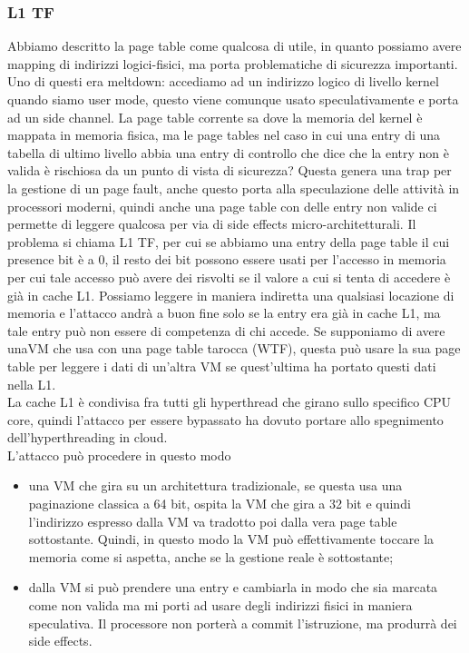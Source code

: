 \documentclass[12pt, oneside]{extbook}
\begin{document}
\subsubsection{L1 TF}
Abbiamo descritto la page table come qualcosa di utile, in quanto possiamo avere mapping di indirizzi logici-fisici, ma porta problematiche di sicurezza importanti. Uno di questi era meltdown: accediamo ad un indirizzo logico di livello kernel quando siamo user mode, questo viene comunque usato speculativamente e porta ad un side channel. La page table corrente sa dove la memoria del kernel è mappata in memoria fisica, ma le page tables nel caso in cui una entry di una tabella di ultimo livello abbia una entry di controllo che dice che la entry non è valida è rischiosa da un punto di vista di sicurezza? Questa genera una trap per la gestione di un page fault, anche questo porta alla speculazione delle attività in processori moderni, quindi anche una page table con delle entry non valide ci permette di leggere qualcosa per via di side effects micro-architetturali. Il problema si chiama L1 TF, per cui se abbiamo una entry della page table il cui presence bit è a 0, il resto dei bit possono essere usati per l'accesso in memoria per cui tale accesso può avere dei risvolti se il valore a cui si tenta di accedere è già in cache L1. Possiamo leggere in maniera indiretta una qualsiasi locazione di memoria e l'attacco andrà a buon fine solo se la entry era già in cache L1, ma tale entry può non essere di competenza di chi accede. Se supponiamo di avere unaVM che usa con una page table tarocca (WTF), questa può usare la sua page table per leggere i dati di un'altra VM se quest'ultima ha portato questi dati nella L1.\\ La cache L1 è condivisa fra tutti gli hyperthread che girano sullo specifico CPU core, quindi l'attacco per essere bypassato ha dovuto portare allo spegnimento dell'hyperthreading in cloud.\\ L'attacco può procedere in questo modo
\begin{itemize}
\item una VM che gira su un architettura tradizionale, se questa usa una paginazione classica a 64 bit, ospita la VM che gira a 32 bit e quindi l'indirizzo espresso dalla VM va tradotto poi dalla vera page table sottostante. Quindi, in questo modo la VM può effettivamente toccare la memoria come si aspetta, anche se la gestione reale è sottostante;
\item dalla VM si può prendere una entry e cambiarla in modo che sia marcata come non valida ma mi porti ad usare degli indirizzi fisici in maniera speculativa. Il processore non porterà a commit l'istruzione, ma produrrà dei side effects.
\end{itemize}
\end{document}
